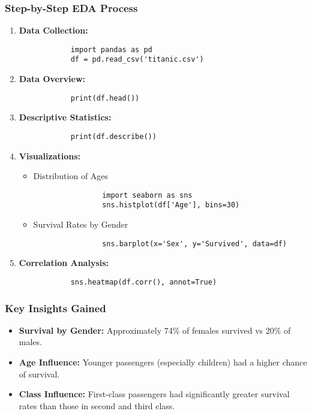 \documentclass[aspectratio=169]{beamer}
\begin{document}
\begin{frame}[fragile]
    \frametitle{Step-by-Step EDA Process}
    \begin{enumerate}
        \item \textbf{Data Collection:}
            \begin{lstlisting}
            import pandas as pd
            df = pd.read_csv('titanic.csv')
            \end{lstlisting}
        
        \item \textbf{Data Overview:}
            \begin{lstlisting}
            print(df.head())
            \end{lstlisting}
        
        \item \textbf{Descriptive Statistics:}
            \begin{lstlisting}
            print(df.describe())
            \end{lstlisting}
        
        \item \textbf{Visualizations:}
            \begin{itemize}
                \item Distribution of Ages
                \begin{lstlisting}
                import seaborn as sns
                sns.histplot(df['Age'], bins=30)
                \end{lstlisting}
                
                \item Survival Rates by Gender
                \begin{lstlisting}
                sns.barplot(x='Sex', y='Survived', data=df)
                \end{lstlisting}
            \end{itemize}
        
        \item \textbf{Correlation Analysis:}
            \begin{lstlisting}
            sns.heatmap(df.corr(), annot=True)
            \end{lstlisting}
    \end{enumerate}
\end{frame}

\begin{frame}[fragile]
    \frametitle{Key Insights Gained}
    \begin{itemize}
        \item \textbf{Survival by Gender:} Approximately 74\% of females survived vs 20\% of males.
        \item \textbf{Age Influence:} Younger passengers (especially children) had a higher chance of survival.
        \item \textbf{Class Influence:} First-class passengers had significantly greater survival rates than those in second and third class.
    \end{itemize}
\end{frame}
\end{document}
